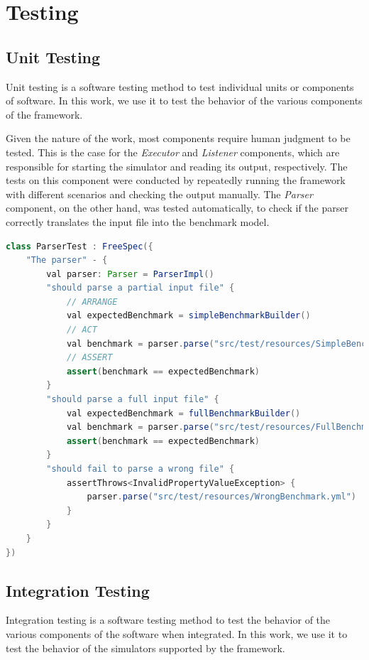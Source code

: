 \documentclass[12pt,a4paper,openright,twoside]{book}
\begin{document}
\section{Testing}

\subsection*{Unit Testing}
Unit testing is a software testing method to test individual units or components of software.
In this work, we use it to test the behavior of the various components of the framework.

Given the nature of the work, most components require human judgment to be tested. 
This is the case for the \emph{Executor} and \emph{Listener} components, which are responsible for starting the simulator and reading its output, respectively.
The tests on this component were conducted by repeatedly running the framework with different scenarios and checking the output manually.
The \emph{Parser} component, on the other hand, was tested automatically, to check if the parser correctly translates the input file into the benchmark model.

\begin{lstlisting}[language=Java]
  class ParserTest : FreeSpec({
    "The parser" - {
        val parser: Parser = ParserImpl()
        "should parse a partial input file" {
            // ARRANGE
            val expectedBenchmark = simpleBenchmarkBuilder()
            // ACT
            val benchmark = parser.parse("src/test/resources/SimpleBenchmark.yml")
            // ASSERT
            assert(benchmark == expectedBenchmark)
        }
        "should parse a full input file" {
            val expectedBenchmark = fullBenchmarkBuilder()
            val benchmark = parser.parse("src/test/resources/FullBenchmark.yml")
            assert(benchmark == expectedBenchmark)
        }
        "should fail to parse a wrong file" {
            assertThrows<InvalidPropertyValueException> {
                parser.parse("src/test/resources/WrongBenchmark.yml")
            }
        }
    }
})
\end{lstlisting}

\subsection*{Integration Testing}

Integration testing is a software testing method to test the behavior of the various components of the software when integrated.
In this work, we use it to test the behavior of the simulators supported by the framework.
\end{document}
